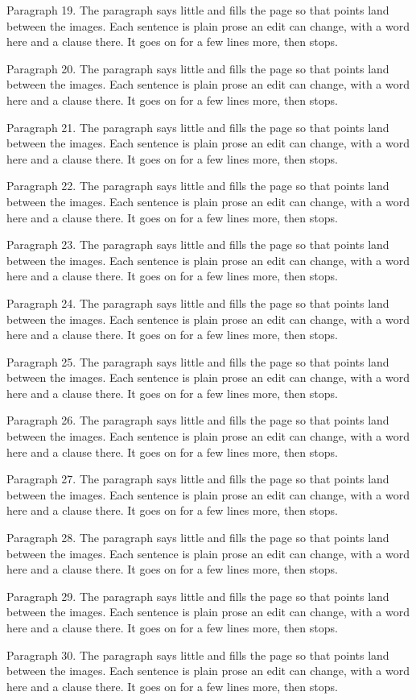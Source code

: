 \documentclass{article}
\begin{document}
Paragraph 19. The paragraph says little and fills the page so that points land between the images. Each sentence is plain prose an edit can change, with a word here and a clause there. It goes on for a few lines more, then stops.

Paragraph 20. The paragraph says little and fills the page so that points land between the images. Each sentence is plain prose an edit can change, with a word here and a clause there. It goes on for a few lines more, then stops.

Paragraph 21. The paragraph says little and fills the page so that points land between the images. Each sentence is plain prose an edit can change, with a word here and a clause there. It goes on for a few lines more, then stops.

Paragraph 22. The paragraph says little and fills the page so that points land between the images. Each sentence is plain prose an edit can change, with a word here and a clause there. It goes on for a few lines more, then stops.

Paragraph 23. The paragraph says little and fills the page so that points land between the images. Each sentence is plain prose an edit can change, with a word here and a clause there. It goes on for a few lines more, then stops.

Paragraph 24. The paragraph says little and fills the page so that points land between the images. Each sentence is plain prose an edit can change, with a word here and a clause there. It goes on for a few lines more, then stops.

\begin{center}
\end{center}

Paragraph 25. The paragraph says little and fills the page so that points land between the images. Each sentence is plain prose an edit can change, with a word here and a clause there. It goes on for a few lines more, then stops.

Paragraph 26. The paragraph says little and fills the page so that points land between the images. Each sentence is plain prose an edit can change, with a word here and a clause there. It goes on for a few lines more, then stops.

Paragraph 27. The paragraph says little and fills the page so that points land between the images. Each sentence is plain prose an edit can change, with a word here and a clause there. It goes on for a few lines more, then stops.

Paragraph 28. The paragraph says little and fills the page so that points land between the images. Each sentence is plain prose an edit can change, with a word here and a clause there. It goes on for a few lines more, then stops.

Paragraph 29. The paragraph says little and fills the page so that points land between the images. Each sentence is plain prose an edit can change, with a word here and a clause there. It goes on for a few lines more, then stops.

Paragraph 30. The paragraph says little and fills the page so that points land between the images. Each sentence is plain prose an edit can change, with a word here and a clause there. It goes on for a few lines more, then stops.
\end{document}
